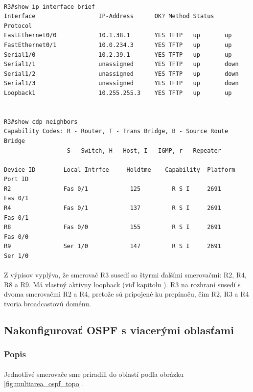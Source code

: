 \documentclass[12pt,twoside,a4paper]{report}
\begin{document}
\noindent
{\selectfont
\begin{small}
\begin{verbatim}

R3#show ip interface brief 
Interface                  IP-Address      OK? Method Status   Protocol
FastEthernet0/0            10.1.38.1       YES TFTP   up       up      
FastEthernet0/1            10.0.234.3      YES TFTP   up       up      
Serial1/0                  10.2.39.1       YES TFTP   up       up      
Serial1/1                  unassigned      YES TFTP   up       down    
Serial1/2                  unassigned      YES TFTP   up       down    
Serial1/3                  unassigned      YES TFTP   up       down    
Loopback1                  10.255.255.3    YES TFTP   up       up      


R3#show cdp neighbors 
Capability Codes: R - Router, T - Trans Bridge, B - Source Route Bridge
                  S - Switch, H - Host, I - IGMP, r - Repeater

Device ID        Local Intrfce     Holdtme    Capability  Platform  Port ID
R2               Fas 0/1            125         R S I     2691      Fas 0/1
R4               Fas 0/1            137         R S I     2691      Fas 0/1
R8               Fas 0/0            155         R S I     2691      Fas 0/0
R9               Ser 1/0            147         R S I     2691      Ser 1/0

\end{verbatim}
\end{small}
}

\paragraph{}
Z výpisov vyplýva, že smerovač R3 susedí so štyrmi ďalšími smerovačmi: R2, R4, R8 a R9. Má vlastný aktívny loopback (viď kapitolu ). R3 na rozhraní  susedí s dvoma smerovačmi R2 a R4, pretože sú pripojené ku prepínaču, čím R2, R3 a R4 tvoria broadcastovú doménu.

\subsection{Nakonfigurovať OSPF s viacerými oblasťami}
\subsubsection{Popis}
\paragraph{}
Jednotlivé smerovače sme priradili do oblastí podľa obrázku \ref{fig:multiarea_ospf_topo}.
\end{document}
